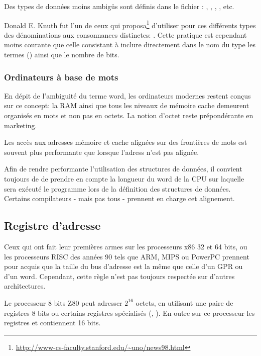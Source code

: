 Des types de données moins ambigüs sont définis dans le fichier :
, , , , etc.

Donald E. Knuth fut l'un de ceux qui proposa\footnote{\url{http://www-cs-faculty.stanford.edu/~uno/news98.html}}
d'utiliser pour ces différents types des dénominations aux consonnances distinctes: .
Cette pratique est cependant moins courante que celle consistant à inclure directement dans le nom du type 
les termes  () ainsi que le nombre de bits.

\subsubsection{Ordinateurs à base de mots}

En dépit de l'ambiguité du terme \gls{word}, les ordinateurs modernes restent conçus sur ce concept: la \ac{RAM} ainsi que tous
les niveaux de mémoire cache demeurent organisés en mots et non pas en octets.
La notion d'octet reste prépondérante en marketing.

Les accès aux adresses mémoire et cache alignées sur des frontières de mots est souvent plus performante que lorsque l'adress n'est pas alignée.

Afin de rendre performante l'utilisation des structures de données, il convient toujours de de prendre en compte la longueur du
\gls{word} de la CPU sur laquelle sera exécuté le programme lors de la définition des structures de données.
Certains compilateurs - mais pas tous - prennent en charge cet alignement.

\subsection{Registre d'adresse}

Ceux qui ont fait leur premières armes sur les processeurs x86 32 et 64 bits, ou les processeurs RISC des années 90
tels que ARM, MIPS ou PowerPC prennent pour acquis que la taille du bus d'adresse est la même que celle d'un \ac{GPR}
ou d'un \gls{word}.
Cependant, cette règle n'est pas toujours respectée sur d'autres architectures.

Le processeur 8 bits Z80 peut adresser $2^{16}$ octets, en utilisant une paire de registres 8 bits ou certains registres
spécialisés (, ). En outre sur ce processeur les registres  et  contiennent 16 bits.

